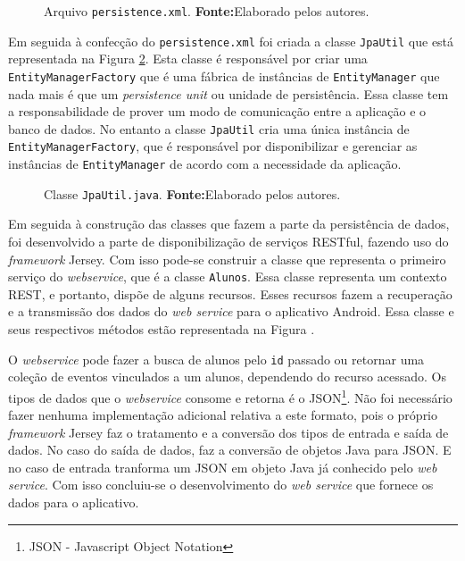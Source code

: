 	\begin{figure}[h!]
		
		\caption[Arquivo \texttt{persistence.xml}]{Arquivo \texttt{persistence.xml}.
		\textbf{Fonte:}Elaborado pelos autores.}
		\label{fig:qm11}
	\end{figure}
	
	\par Em seguida à confecção do \texttt{persistence.xml} foi criada a
classe \texttt{JpaUtil} que está representada na Figura \ref{fig:qm12}.
Esta classe é responsável por criar uma \texttt{EntityManagerFactory} que é
uma  fábrica de instâncias de \texttt{EntityManager} que nada mais é que um
\textit{persistence unit} ou unidade de persistência. Essa classe tem a
responsabilidade de prover um modo de comunicação entre a aplicação e o banco
de dados. No entanto a classe \texttt{JpaUtil} cria uma única instância de
\texttt{EntityManagerFactory}, que é responsável por disponibilizar e
gerenciar as instâncias de \texttt{EntityManager} de acordo com a necessidade
da aplicação.
	
	\pagebreak
	\begin{figure}[h!]
		
		\caption[Classe \texttt{JpaUtil.java}]{Classe \texttt{JpaUtil.java}.
		\textbf{Fonte:}Elaborado pelos autores.}
		\label{fig:qm12}
	\end{figure}
		
	\par Em seguida à construção das classes que fazem a parte da persistência de
dados, foi desenvolvido a parte de disponibilização de serviços
RESTful, fazendo uso do \textit{framework} Jersey. Com isso
pode-se construir a classe que representa o primeiro serviço do
\textit{webservice}, que é a classe \texttt{Alunos}. Essa classe representa um
contexto REST, e portanto, dispõe de alguns recursos. Esses recursos fazem a
recuperação e a transmissão dos dados do \textit{web service} para o aplicativo
Android. Essa classe e seus respectivos métodos  estão representada na
Figura .
		
		\par O \textit{webservice} pode fazer a busca de alunos pelo \texttt{id}
passado ou retornar uma coleção de eventos vinculados a um alunos, dependendo
do recurso acessado. Os tipos de dados que o \textit{webservice} consome e
retorna é o JSON\footnote{JSON - Javascript Object Notation}. Não foi
necessário fazer nenhuma implementação adicional relativa a este formato, pois
o próprio \textit{framework} Jersey faz o tratamento e a conversão dos tipos de
entrada e saída de dados. No caso do saída de dados, faz a conversão de objetos 
Java para JSON. E no caso de entrada tranforma um JSON em objeto
Java já conhecido pelo \textit{web service}. Com isso concluiu-se o
desenvolvimento do \textit{web service} que fornece os dados para o aplicativo.

